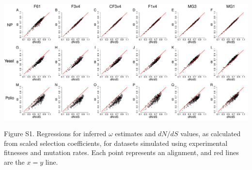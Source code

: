 \documentclass[11pt]{article}
\begin{document}
\newpage

\begin{landscape}
	\includegraphics[width=9.5in]{figures/SI/nyp_regression.pdf}
	\vspace{0.5cm}
	
	Figure S1. Regressions for inferred $\omega$ estimates and $dN/dS$ values, as calculated from scaled selection coefficients, for datasets simulated using experimental fitnesses and mutation rates. Each point represents an alignment, and red lines are the $x=y$ line.
\end{landscape}
\end{document}
